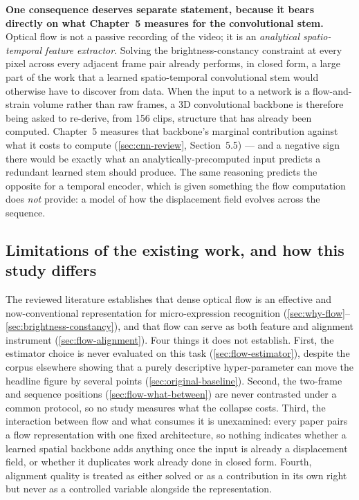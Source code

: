 \textbf{One consequence deserves separate statement, because it bears directly on what Chapter~5 measures for the convolutional stem.} Optical flow is not a passive recording of the video; it is an \textit{analytical spatio-temporal feature extractor}. Solving the brightness-constancy constraint at every pixel across every adjacent frame pair already performs, in closed form, a large part of the work that a learned spatio-temporal convolutional stem would otherwise have to discover from data. When the input to a network is a flow-and-strain volume rather than raw frames, a 3D convolutional backbone is therefore being asked to re-derive, from 156 clips, structure that has already been computed. Chapter~5 measures that backbone's marginal contribution against what it costs to compute (\autoref{sec:cnn-review}, Section~5.5) --- and a negative sign there would be exactly what an analytically-precomputed input predicts a redundant learned stem should produce. The same reasoning predicts the opposite for a temporal encoder, which is given something the flow computation does \textit{not} provide: a model of how the displacement field evolves across the sequence.

\subsection{Limitations of the existing work, and how this study differs}
\label{sec:flow-gap}

The reviewed literature establishes that dense optical flow is an effective and now-conventional representation for micro-expression recognition (\autoref{sec:why-flow}--\autoref{sec:brightness-constancy}), and that flow can serve as both feature and alignment instrument (\autoref{sec:flow-alignment}). Four things it does not establish. First, the estimator choice is never evaluated on this task (\autoref{sec:flow-estimator}), despite the corpus elsewhere showing that a purely descriptive hyper-parameter can move the headline figure by several points (\autoref{sec:original-baseline}). Second, the two-frame and sequence positions (\autoref{sec:flow-what-between}) are never contrasted under a common protocol, so no study measures what the collapse costs. Third, the interaction between flow and what consumes it is unexamined: every paper pairs a flow representation with one fixed architecture, so nothing indicates whether a learned spatial backbone adds anything once the input is already a displacement field, or whether it duplicates work already done in closed form. Fourth, alignment quality is treated as either solved or as a contribution in its own right~\cite{xu2017} but never as a controlled variable alongside the representation.

